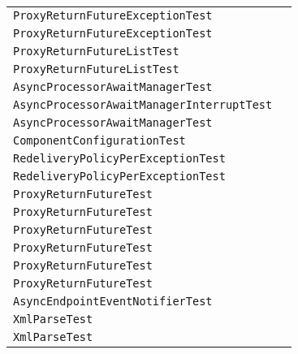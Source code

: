 \begin{center}
\begin{tabular}{ll}
\lstinline/ProxyReturnFutureExceptionTest/&\raisebox{0pt}{\lstinline/testFutureEchoException()/}\\
\lstinline/ProxyReturnFutureExceptionTest/&\raisebox{0pt}{\lstinline/testFutureEchoException()/}\\
\lstinline/ProxyReturnFutureListTest/&\raisebox{0pt}{\lstinline/testFutureList()/}\\
\lstinline/ProxyReturnFutureListTest/&\raisebox{0pt}{\lstinline/testFutureList()/}\\
\lstinline/AsyncProcessorAwaitManagerTest/&\raisebox{0pt}{\lstinline/process(Exchange)/}\\
\lstinline/AsyncProcessorAwaitManagerInterruptTest/&\raisebox{0pt}{\lstinline/process(Exchange)/}\\
\lstinline/AsyncProcessorAwaitManagerTest/&\raisebox{0pt}{\lstinline/process(Exchange)/}\\
\lstinline/ComponentConfigurationTest/&\raisebox{0pt}{\lstinline/IntrospectSedaEndpointParameters()/}\\
\lstinline/RedeliveryPolicyPerExceptionTest/&\raisebox{0pt}{\lstinline/testUsingCustomExceptionHandlerAndOneRedelivery()/}\\
\lstinline/RedeliveryPolicyPerExceptionTest/&\raisebox{0pt}{\lstinline/testUsingCustomExceptionHandlerWithNoRedeliveries()/}\\
\lstinline/ProxyReturnFutureTest/&\raisebox{0pt}{\lstinline/testFutureEchoCallTwoTimes()/}\\
\lstinline/ProxyReturnFutureTest/&\raisebox{0pt}{\lstinline/testFutureEchoCallTwoTimes()/}\\
\lstinline/ProxyReturnFutureTest/&\raisebox{0pt}{\lstinline/testFutureEchoCallTwoTimes()/}\\
\lstinline/ProxyReturnFutureTest/&\raisebox{0pt}{\lstinline/testFutureEchoCallTwoTimes()/}\\
\lstinline/ProxyReturnFutureTest/&\raisebox{0pt}{\lstinline/testFutureEcho()/}\\
\lstinline/ProxyReturnFutureTest/&\raisebox{0pt}{\lstinline/testFutureEcho()/}\\
\lstinline/AsyncEndpointEventNotifierTest/&\raisebox{0pt}{\lstinline/testAsyncEndpointEventNotifier()/}\\
\lstinline/XmlParseTest/&\raisebox{0pt}{\lstinline/assertChildTo(Stringmessage,ProcessorDefinition<?>route,String)/}\\
\lstinline/XmlParseTest/&\raisebox{0pt}{\lstinline/assertTo(Stringmessage,ProcessorDefinition<?>processor,String)/}\\

\end{tabular}
\end{center}
